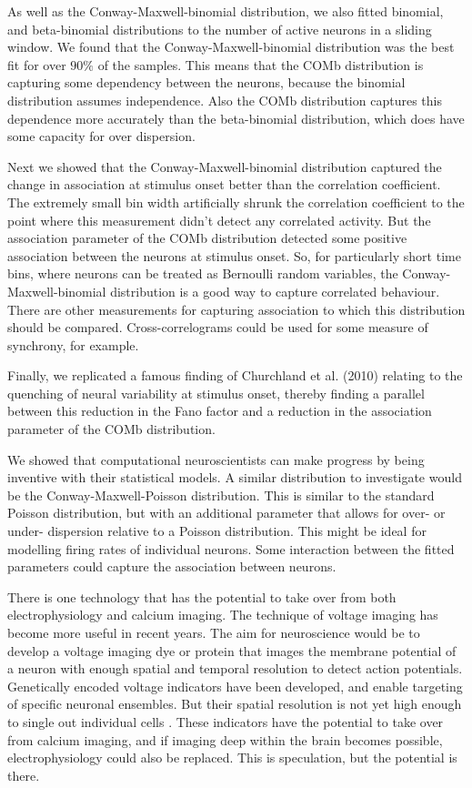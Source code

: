 As well as the Conway-Maxwell-binomial distribution, we also fitted binomial, and beta-binomial distributions to the number of active neurons in a sliding window. We found that the Conway-Maxwell-binomial distribution was the best fit for over $90\%$ of the samples. This means that the COMb distribution is capturing some dependency between the neurons, because the binomial distribution assumes independence. Also the COMb distribution captures this dependence more accurately than the beta-binomial distribution, which does have some capacity for over dispersion.

Next we showed that the Conway-Maxwell-binomial distribution captured the change in association at stimulus onset better than the correlation coefficient. The extremely small bin width artificially shrunk the correlation coefficient to the point where this measurement didn't detect any correlated activity. But the association parameter of the COMb distribution detected some positive association between the neurons at stimulus onset. So, for particularly short time bins, where neurons can be treated as Bernoulli random variables, the Conway-Maxwell-binomial distribution is a good way to capture correlated behaviour. There are other measurements for capturing association to which this distribution should be compared. Cross-correlograms could be used for some measure of synchrony, for example.

Finally, we replicated a famous finding of Churchland et al. (2010) relating to the quenching of neural variability at stimulus onset, thereby finding a parallel between this reduction in the Fano factor and a reduction in the association parameter of the COMb distribution.

We showed that computational neuroscientists can make progress by being inventive with their statistical models. A similar distribution to investigate would be the Conway-Maxwell-Poisson distribution. This is similar to the standard Poisson distribution, but with an additional parameter that allows for over- or under- dispersion relative to a Poisson distribution. This might be ideal for modelling firing rates of individual neurons. Some interaction between the fitted parameters could capture the association between neurons.

There is one technology that has the potential to take over from both electrophysiology and calcium imaging. The technique of voltage imaging has become more useful in recent years. The aim for neuroscience would be to develop a voltage imaging dye or protein that images the membrane potential of a neuron with enough spatial and temporal resolution to detect action potentials. Genetically encoded voltage indicators have been developed, and enable targeting of specific neuronal ensembles. But their spatial resolution is not yet high enough to single out individual cells \parencite{bando}. These indicators have the potential to take over from calcium imaging, and if imaging deep within the brain becomes possible, electrophysiology could also be replaced. This is speculation, but the potential is there.
